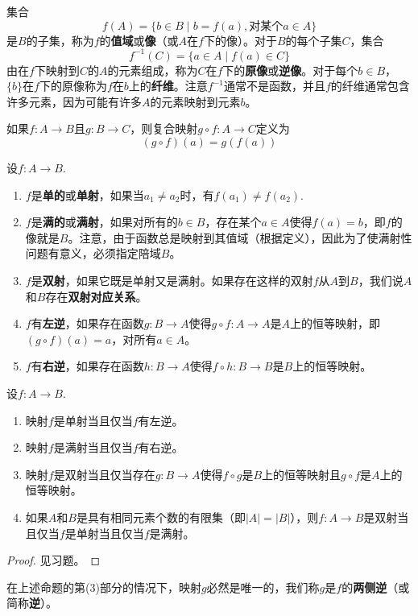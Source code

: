 集合
\[ f(A) = \{ b \in B \mid b = f(a), \text{对某个} a \in A \} \]
是$B$的子集，称为$f$的\textbf{值域}或\textbf{像}（或$A$在$f$下的像）。对于$B$的每个子集$C$，集合
\[ f^{-1}(C) = \{ a \in A \mid f(a) \in C \} \]
由在$f$下映射到$C$的$A$的元素组成，称为$C$在$f$下的\textbf{原像}或\textbf{逆像}。对于每个$b \in B$，$\{b\}$在$f$下的原像称为$f$在$b$上的\textbf{纤维}。注意$f^{-1}$通常不是函数，并且$f$的纤维通常包含许多元素，因为可能有许多$A$的元素映射到元素$b$。

如果$f: A \to B$且$g: B \to C$，则复合映射$g \circ f: A \to C$定义为
\[ (g \circ f)(a) = g(f(a)) \]

设$f: A \to B$.
\begin{enumerate}[label=(\arabic*)] 
\item $f$是\textbf{单的}或\textbf{单射}，如果当$a_1 \neq a_2$时，有$f(a_1) \neq f(a_2)$.
\item $f$是\textbf{满的}或\textbf{满射}，如果对所有的$b \in B$，存在某个$a \in A$使得$f(a) = b$，即$f$的像就是$B$。注意，由于函数总是映射到其值域（根据定义），因此为了使满射性问题有意义，必须指定陪域$B$。
\item $f$是\textbf{双射}，如果它既是单射又是满射。如果存在这样的双射$f$从$A$到$B$，我们说$A$和$B$存在\textbf{双射对应关系}。
\item $f$有\textbf{左逆}，如果存在函数$g: B \to A$使得$g \circ f: A \to A$是$A$上的恒等映射，即$(g \circ f)(a) = a$，对所有$a \in A$。
\item $f$有\textbf{右逆}，如果存在函数$h: B \to A$使得$f \circ h: B \to B$是$B$上的恒等映射。
\end{enumerate}

\begin{proposition}
\label{pro:0-1}
设$f: A \to B$.
\begin{enumerate}[label=(\arabic*)]
\item 映射$f$是单射当且仅当$f$有左逆。
\item 映射$f$是满射当且仅当$f$有右逆。
\item 映射$f$是双射当且仅当存在$g: B \to A$使得$f \circ g$是$B$上的恒等映射且$g \circ f$是$A$上的恒等映射。
\item 如果$A$和$B$是具有相同元素个数的有限集（即$|A| = |B|$），则$f: A \to B$是双射当且仅当$f$是单射当且仅当$f$是满射。
\end{enumerate}
\end{proposition}
\begin{proof}
见习题。
\end{proof}

在上述命题的第(3)部分的情况下，映射$g$必然是唯一的，我们称$g$是$f$的\textbf{两侧逆}（或简称\textbf{逆}）。

